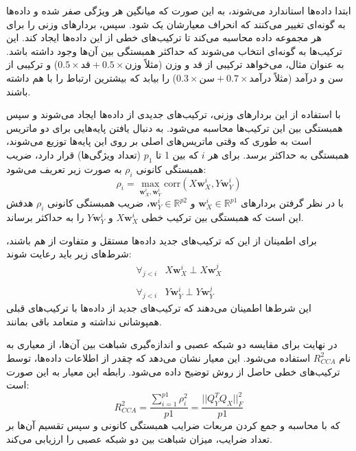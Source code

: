 ابتدا داده‌ها استاندارد می‌شوند، به این صورت که میانگین هر ویژگی صفر شده و داده‌ها به گونه‌ای تغییر می‌کنند که انحراف معیارشان یک شود. سپس،
بردارهای وزنی را برای هر مجموعه داده محاسبه می‌کند تا ترکیب‌های خطی از این داده‌ها ایجاد کند. این ترکیب‌ها به گونه‌ای انتخاب می‌شوند که حداکثر همبستگی بین آن‌ها وجود داشته باشد. به عنوان مثال،
می‌خواهد ترکیبی از قد و وزن (مثلاً \(0.5 \times \text{قد} + 0.5 \times \text{وزن}\)) و ترکیبی از سن و درآمد (مثلاً \(0.3 \times \text{سن} + 0.7 \times \text{درآمد}\)) را بیابد که بیشترین ارتباط را با هم داشته باشند.

با استفاده از این بردارهای وزنی، ترکیب‌های جدیدی از داده‌ها ایجاد می‌شوند و سپس همبستگی بین این ترکیب‌ها محاسبه می‌شود.
به دنبال یافتن پایه‌هایی برای دو ماتریس است به طوری که وقتی ماتریس‌های اصلی بر روی این پایه‌ها توزیع می‌شوند، همبستگی به حداکثر برسد. برای هر \(i\) که بین 1 تا \(p_1\) (تعداد ویژگی‌ها) قرار دارد، ضریب همبستگی کانونی \( \rho_i \) به صورت زیر تعریف می‌شود: 
\begin{equation}
	\rho_i = \max_{\mathbf{w}_X^i, \mathbf{w}_Y^i} \text{corr}(X \mathbf{w}_X^i, Y \mathbf{w}_Y^i)
\end{equation}
با در نظر گرفتن بردارهای \(\mathbf{w}_X^i \in \mathbb{R}^{p1}\) و \(\mathbf{w}_Y^i \in \mathbb{R}^{p2}\)، ضریب همبستگی کانونی \( \rho_i \) هدفش این است که همبستگی بین ترکیب خطی \( X \mathbf{w}_X^i \) و \( Y \mathbf{w}_Y^i \) را به حداکثر برساند.

برای اطمینان از این که ترکیب‌های جدید داده‌ها مستقل و متفاوت از هم باشند، شرط‌های زیر باید رعایت شوند:
\begin{equation}
	\begin{array}{ll}
		\forall_{j<i} & X \mathbf{w}_X^i \perp X \mathbf{w}_X^j
		\\
		\\
		\forall_{j<i} & Y \mathbf{w}_Y^i \perp Y \mathbf{w}_Y^j
	\end{array}
\end{equation}
این شرط‌ها اطمینان می‌دهند که ترکیب‌های جدید از داده‌ها با ترکیب‌های قبلی همپوشانی نداشته و متعامد باقی بمانند.

در نهایت برای مقایسه دو شبکه عصبی و اندازه‌گیری شباهت بین آن‌ها، از معیاری به نام \( R^2_{CCA} \) استفاده می‌شود. این معیار نشان می‌دهد که چقدر از اطلاعات داده‌ها، توسط ترکیب‌های خطی حاصل از روش
توضیح داده می‌شود. رابطه این معیار به این صورت است:
\begin{equation}
	R^2_{CCA} = \frac{\sum_{i=1}^{p1} \rho^2_i}{p1} = \frac{||Q^T_Y Q_X||^2_F}{p1}
	\label{eq_CCA}
\end{equation}
که با محاسبه و جمع کردن مربعات ضرایب همبستگی کانونی و سپس تقسیم آن‌ها بر تعداد ضرایب، میزان شباهت بین دو شبکه عصبی را ارزیابی می‌کند.

